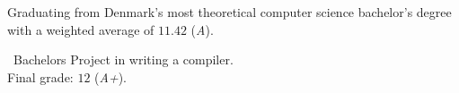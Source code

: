 Graduating from Denmark's most theoretical computer science bachelor's degree with a weighted average of $11.42$ (\emph{A}).

\medskip

\faFileO\ Bachelors Project in writing a compiler. \\ Final grade: $12$ (\emph{A+}).
